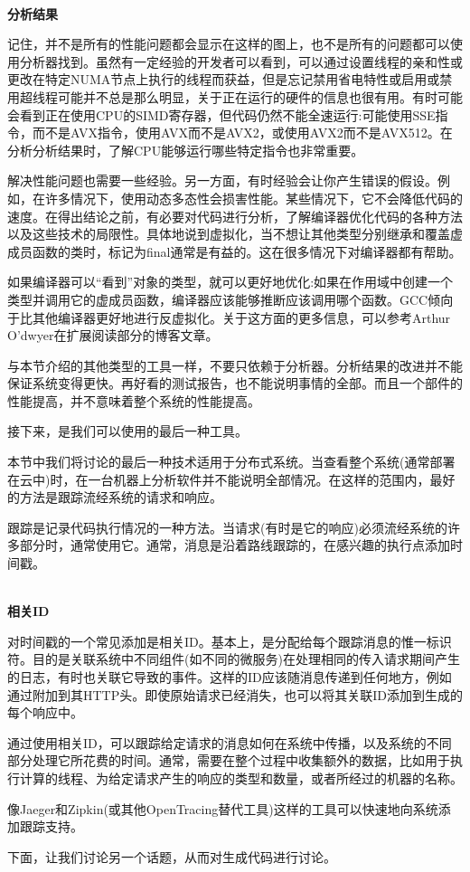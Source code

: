 \hspace*{\fill} \\ %
\noindent
\textbf{分析结果}

记住，并不是所有的性能问题都会显示在这样的图上，也不是所有的问题都可以使用分析器找到。虽然有一定经验的开发者可以看到，可以通过设置线程的亲和性或更改在特定NUMA节点上执行的线程而获益，但是忘记禁用省电特性或启用或禁用超线程可能并不总是那么明显，关于正在运行的硬件的信息也很有用。有时可能会看到正在使用CPU的SIMD寄存器，但代码仍然不能全速运行:可能使用SSE指令，而不是AVX指令，使用AVX而不是AVX2，或使用AVX2而不是AVX512。在分析分析结果时，了解CPU能够运行哪些特定指令也非常重要。

解决性能问题也需要一些经验。另一方面，有时经验会让你产生错误的假设。例如，在许多情况下，使用动态多态性会损害性能。某些情况下，它不会降低代码的速度。在得出结论之前，有必要对代码进行分析，了解编译器优化代码的各种方法以及这些技术的局限性。具体地说到虚拟化，当不想让其他类型分别继承和覆盖虚成员函数的类时，标记为final通常是有益的。这在很多情况下对编译器都有帮助。

如果编译器可以“看到”对象的类型，就可以更好地优化:如果在作用域中创建一个类型并调用它的虚成员函数，编译器应该能够推断应该调用哪个函数。GCC倾向于比其他编译器更好地进行反虚拟化。关于这方面的更多信息，可以参考Arthur O’dwyer在扩展阅读部分的博客文章。

与本节介绍的其他类型的工具一样，不要只依赖于分析器。分析结果的改进并不能保证系统变得更快。再好看的测试报告，也不能说明事情的全部。而且一个部件的性能提高，并不意味着整个系统的性能提高。

接下来，是我们可以使用的最后一种工具。


本节中我们将讨论的最后一种技术适用于分布式系统。当查看整个系统(通常部署在云中)时，在一台机器上分析软件并不能说明全部情况。在这样的范围内，最好的方法是跟踪流经系统的请求和响应。

跟踪是记录代码执行情况的一种方法。当请求(有时是它的响应)必须流经系统的许多部分时，通常使用它。通常，消息是沿着路线跟踪的，在感兴趣的执行点添加时间戳。

\hspace*{\fill} \\ %
\noindent
\textbf{相关ID}

对时间戳的一个常见添加是相关ID。基本上，是分配给每个跟踪消息的惟一标识符。目的是关联系统中不同组件(如不同的微服务)在处理相同的传入请求期间产生的日志，有时也关联它导致的事件。这样的ID应该随消息传递到任何地方，例如通过附加到其HTTP头。即使原始请求已经消失，也可以将其关联ID添加到生成的每个响应中。

通过使用相关ID，可以跟踪给定请求的消息如何在系统中传播，以及系统的不同部分处理它所花费的时间。通常，需要在整个过程中收集额外的数据，比如用于执行计算的线程、为给定请求产生的响应的类型和数量，或者所经过的机器的名称。

像Jaeger和Zipkin(或其他OpenTracing替代工具)这样的工具可以快速地向系统添加跟踪支持。

下面，让我们讨论另一个话题，从而对生成代码进行讨论。





